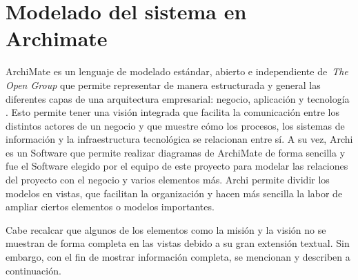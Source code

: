 \section{Modelado del sistema en Archimate}
ArchiMate es un lenguaje de modelado estándar, abierto e independiente de~\textit{The Open Group} que permite representar de manera estructurada y general las diferentes capas de una arquitectura empresarial: negocio, aplicación y tecnología \citep{josey2016introduction}. Esto permite tener una visión integrada que facilita la comunicación entre los distintos actores de un negocio y que muestre cómo los procesos, los sistemas de información y la infraestructura tecnológica se relacionan entre sí.
A su vez, Archi es un Software que permite realizar diagramas de ArchiMate de forma sencilla y fue el Software elegido por el equipo de este proyecto para modelar las relaciones del proyecto con el negocio y varios elementos más. Archi permite dividir los modelos en vistas, que facilitan la organización y hacen más sencilla la labor de ampliar ciertos elementos o modelos importantes.

Cabe recalcar que algunos de los elementos como la misión y la visión no se muestran de forma completa en las vistas debido a su gran extensión textual. Sin embargo, con el fin de mostrar información completa, se mencionan y describen a continuación.

